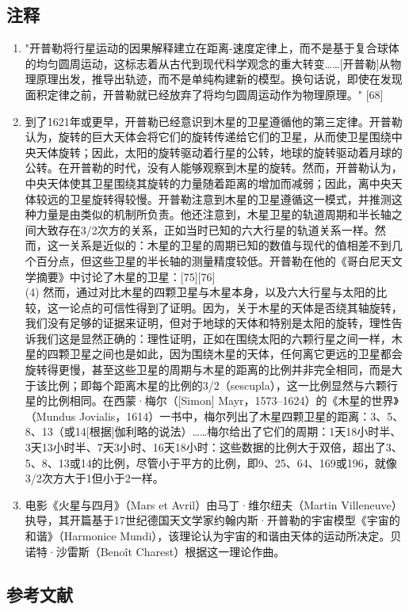 \subsection{注释}
\begin{enumerate}
\item "开普勒将行星运动的因果解释建立在距离-速度定律上，而不是基于复合球体的均匀圆周运动，这标志着从古代到现代科学观念的重大转变……[开普勒]从物理原理出发，推导出轨迹，而不是单纯构建新的模型。换句话说，即使在发现面积定律之前，开普勒就已经放弃了将均匀圆周运动作为物理原理。" [68]
\item 到了1621年或更早，开普勒已经意识到木星的卫星遵循他的第三定律。开普勒认为，旋转的巨大天体会将它们的旋转传递给它们的卫星，从而使卫星围绕中央天体旋转；因此，太阳的旋转驱动着行星的公转，地球的旋转驱动着月球的公转。在开普勒的时代，没有人能够观察到木星的旋转。然而，开普勒认为，中央天体使其卫星围绕其旋转的力量随着距离的增加而减弱；因此，离中央天体较远的卫星旋转得较慢。开普勒注意到木星的卫星遵循这一模式，并推测这种力量是由类似的机制所负责。他还注意到，木星卫星的轨道周期和半长轴之间大致存在3/2次方的关系，正如当时已知的六大行星的轨道关系一样。然而，这一关系是近似的：木星的卫星的周期已知的数值与现代的值相差不到几个百分点，但这些卫星的半长轴的测量精度较低。开普勒在他的《哥白尼天文学摘要》中讨论了木星的卫星：[75][76]\\
  (4) 然而，通过对比木星的四颗卫星与木星本身，以及六大行星与太阳的比较，这一论点的可信性得到了证明。因为，关于木星的天体是否绕其轴旋转，我们没有足够的证据来证明，但对于地球的天体和特别是太阳的旋转，理性告诉我们这是显然正确的：理性证明，正如在围绕太阳的六颗行星之间一样，木星的四颗卫星之间也是如此，因为围绕木星的天体，任何离它更远的卫星都会旋转得更慢，甚至这些卫星的周期与木星的距离的比例并非完全相同，而是大于该比例；即每个距离木星的比例的3/2（sescupla），这一比例显然与六颗行星的比例相同。在西蒙·梅尔（[Simon] Mayr，1573–1624）的《木星的世界》（Mundus Jovialis，1614）一书中，梅尔列出了木星四颗卫星的距离：3、5、8、13（或14[根据]伽利略的说法）……梅尔给出了它们的周期：1天18小时半、3天13小时半、7天3小时、16天18小时：这些数据的比例大于双倍，超出了3、5、8、13或14的比例，尽管小于平方的比例，即9、25、64、169或196，就像3/2次方大于1但小于2一样。
\item 电影《火星与四月》（Mars et Avril）由马丁·维尔纽夫（Martin Villeneuve）执导，其开篇基于17世纪德国天文学家约翰内斯·开普勒的宇宙模型《宇宙的和谐》（Harmonice Mundi），该理论认为宇宙的和谐由天体的运动所决定。贝诺特·沙雷斯（Benoît Charest）根据这一理论作曲。
\end{enumerate}
\subsection{参考文献}
